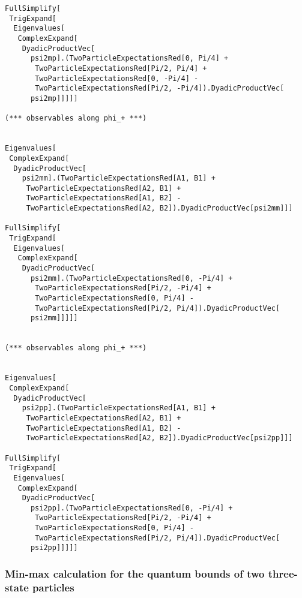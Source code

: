 \documentclass[%
  twocolumn,
 showpacs,
 showkeys,
 preprintnumbers,
 amsmath,amssymb,
 aps,
  pra,
  longbibliography,
 floatfix,
 ]{revtex4-1}
\begin{document}
{\begin{lstlisting}[backgroundcolor=\color{yellow!10},framerule=0pt,breaklines=true, frame=tb]
FullSimplify[
 TrigExpand[
  Eigenvalues[
   ComplexExpand[
    DyadicProductVec[
      psi2mp].(TwoParticleExpectationsRed[0, Pi/4] +
       TwoParticleExpectationsRed[Pi/2, Pi/4] +
       TwoParticleExpectationsRed[0, -Pi/4] -
       TwoParticleExpectationsRed[Pi/2, -Pi/4]).DyadicProductVec[
      psi2mp]]]]]

(*** observables along phi_+ ***)


Eigenvalues[
 ComplexExpand[
  DyadicProductVec[
    psi2mm].(TwoParticleExpectationsRed[A1, B1] +
     TwoParticleExpectationsRed[A2, B1] +
     TwoParticleExpectationsRed[A1, B2] -
     TwoParticleExpectationsRed[A2, B2]).DyadicProductVec[psi2mm]]]

FullSimplify[
 TrigExpand[
  Eigenvalues[
   ComplexExpand[
    DyadicProductVec[
      psi2mm].(TwoParticleExpectationsRed[0, -Pi/4] +
       TwoParticleExpectationsRed[Pi/2, -Pi/4] +
       TwoParticleExpectationsRed[0, Pi/4] -
       TwoParticleExpectationsRed[Pi/2, Pi/4]).DyadicProductVec[
      psi2mm]]]]]


(*** observables along phi_+ ***)


Eigenvalues[
 ComplexExpand[
  DyadicProductVec[
    psi2pp].(TwoParticleExpectationsRed[A1, B1] +
     TwoParticleExpectationsRed[A2, B1] +
     TwoParticleExpectationsRed[A1, B2] -
     TwoParticleExpectationsRed[A2, B2]).DyadicProductVec[psi2pp]]]

FullSimplify[
 TrigExpand[
  Eigenvalues[
   ComplexExpand[
    DyadicProductVec[
      psi2pp].(TwoParticleExpectationsRed[0, -Pi/4] +
       TwoParticleExpectationsRed[Pi/2, -Pi/4] +
       TwoParticleExpectationsRed[0, Pi/4] -
       TwoParticleExpectationsRed[Pi/2, Pi/4]).DyadicProductVec[
      psi2pp]]]]]

\end{lstlisting}  }


\subsubsection{Min-max calculation for the quantum bounds of two three-state particles}
\end{document}
